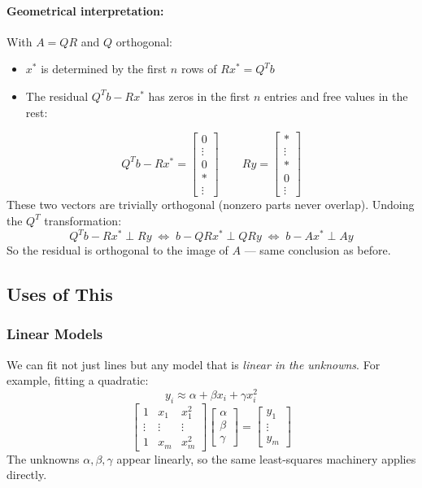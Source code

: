 \documentclass{article}
\begin{document}
\paragraph{Geometrical interpretation:}
With $A = QR$ and $Q$ orthogonal:
\begin{itemize}
  \item $x^*$ is determined by the first $n$ rows of $Rx^* = Q^Tb$
  \item The residual $Q^Tb - Rx^*$ has zeros in the first $n$ entries
        and free values in the rest:
\end{itemize}
\[
  Q^Tb - Rx^* = \begin{bmatrix} 0 \\ \vdots \\ 0 \\ \ast \\ \vdots \end{bmatrix}
  \qquad
  Ry = \begin{bmatrix} \ast \\ \vdots \\ \ast \\ 0 \\ \vdots \end{bmatrix}
\]
These two vectors are trivially orthogonal (nonzero parts never overlap). Undoing
the $Q^T$ transformation:
\[
  Q^Tb - Rx^* \perp Ry
  \;\Longleftrightarrow\; b - QRx^* \perp QRy
  \;\Longleftrightarrow\; b - Ax^* \perp Ay
\]
So the residual is orthogonal to the image of $A$ — same conclusion as before.

\subsection{Uses of This}

\subsubsection{Linear Models}
We can fit not just lines but any model that is \emph{linear in the unknowns}.
For example, fitting a quadratic:
\[y_i \approx \alpha + \beta x_i + \gamma x_i^2\]
\[
\begin{bmatrix}
  1 & x_1 & x_1^2 \\
  \vdots & \vdots & \vdots \\
  1 & x_m & x_m^2
\end{bmatrix}
\begin{bmatrix} \alpha \\ \beta \\ \gamma \end{bmatrix}
=
\begin{bmatrix} y_1 \\ \vdots \\ y_m \end{bmatrix}
\]
The unknowns $\alpha, \beta, \gamma$ appear linearly, so the same least-squares
machinery applies directly.
\end{document}
